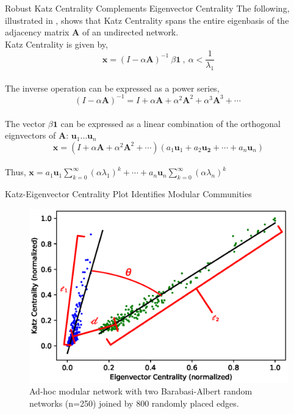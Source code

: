 \documentclass[aspectratio=169,11pt]{beamer}
\begin{document}
\begin{frame}{Robust Katz Centrality Complements Eigenvector Centrality}
			The following, illustrated in \cite{localization}, shows that Katz Centrality spans the entire eigenbasis of the adjacency matrix $\mathbf{A}$ of an undirected network.
			\\
			Katz Centrality\cite{katz} is given by,\\
			\begin{equation*}
			\mathbf{x} = (I-\alpha \mathbf{A})^{-1}~\beta\textbf{1}~,~\alpha < \frac{1}{\lambda_1}
			\end{equation*}\\
			The inverse operation can be expressed as a power series,
			\begin{equation*}
			(I - \alpha \mathbf{A})^{-1} = I + \alpha \mathbf{A} + \alpha^2 \mathbf{A}^2 + \alpha^3 \mathbf{A}^3 + \dotsi~
			\end{equation*}\\
			The vector $\beta\textbf{1}$ can be expressed as a linear combination of the orthogonal eignvectors of $\mathbf{A}$: $\mathbf{u}_1 \dots \mathbf{u}_n$\\
			\begin{equation*}
			 \mathbf{x} = (I + \alpha \mathbf{A} + \alpha^2 \mathbf{A}^2 + \dotsi ) (a_1\mathbf{u}_1 + a_2\mathbf{u_2} + \dotsi + a_n\mathbf{u}_n)
			\end{equation*}\\
			Thus, $ \mathbf{x} = a_1\mathbf{u}_1\sum_{k=0}^{\infty}(\alpha\lambda_1)^k +
			\dotsi +
			a_n\mathbf{u}_n\sum_{k=0}^{\infty}(\alpha\lambda_n)^k$
\end{frame}

\begin{frame}{Katz-Eigenvector Centrality Plot Identifies Modular Communities}
	
	\begin{figure}
		\centering
		\includegraphics[scale=0.6]{./example_ba}
		\caption{Ad-hoc modular network with two Barabasi-Albert\cite{BA} random networks (n=250) joined by 800 randomly placed edges.}
	\end{figure}
\end{frame}
\end{document}
